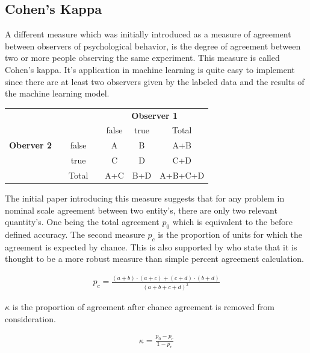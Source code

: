 \documentclass[
a4paper, 
12pt,
grayscalebody, %
abstract=on,
twoside, BCOR10mm, 12pt, DIV13,headinclude, footexclude, final, abstracton, openright
]{ibireprt}
\numberwithin{equation}{chapter}
\numberwithin{table}{chapter}
\numberwithin{figure}{chapter}
\numberwithin{algorithm}{chapter}
\numberwithin{example}{chapter}
\numberwithin{example}{chapter}
\begin{document}
\subsection{Cohen's Kappa}
A different measure which was initially introduced as a measure of agreement between observers of psychological behavior, is the degree of agreement between two or more people observing the same experiment. This measure is called Cohen's kappa. It's application in machine learning is quite easy to implement since there are at least two observers given by the labeled data and the results of the machine learning model.


\newcommand{\STAB}[1]{\begin{tabular}{@{}c@{}}#1\end{tabular}}
\begin{center}
	\begin{tabular}{ccccccc}
		\hline
		&&&&\multicolumn{3}{c}{\textbf{Observer 1}}\\
		&&&&false&true&Total\\
		\hline
		\textbf{Oberver 2}&&false& &A &B &A+B \\
		
		&&true&&C&D&C+D\\
				
		&&Total&&A+C&B+D&A+B+C+D\\
	\end{tabular}
\end{center}

The initial paper\cite{Cohen1960} introducing this measure suggests that for any problem in nominal scale agreement between two entity's, there are only two relevant quantity's. One being the total agreement $p_0$ which is equivalent to the before defined accuracy. The second measure $p_c$ is the proportion of units for which the agreement is expected by chance. This is also supported by \cite{Vieira2010} who state that it is thought to be a more robust measure
than simple percent agreement calculation.

\begin{align}
	p_c =\frac{(a+b)\cdot(a+c)+(c+d)\cdot(b+d)}{(a+b+c+d)^2}
\end{align}

$\kappa$ is the proportion of agreement after chance agreement is removed from consideration. 

\begin{align}
	\kappa = \frac{p_0-p_c}{1-p_c}
\end{align}
\end{document}
